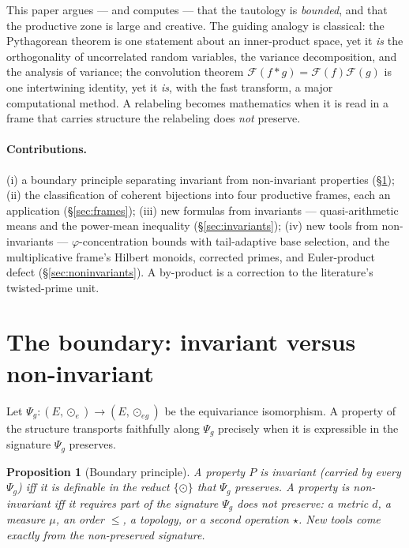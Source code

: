 \documentclass[11pt,a4paper]{article}
\theoremstyle{plain}
\newtheorem{proposition}[theorem]{Proposition}
\theoremstyle{definition}
\theoremstyle{remark}
\begin{document}
This paper argues --- and computes --- that the tautology is \emph{bounded}, and
that the productive zone is large and creative. The guiding analogy is classical:
the Pythagorean theorem is one statement about an inner-product space, yet it
\emph{is} the orthogonality of uncorrelated random variables, the variance
decomposition, and the analysis of variance; the convolution theorem
$\mathcal F(f*g)=\mathcal F(f)\mathcal F(g)$ is one intertwining identity, yet it
\emph{is}, with the fast transform, a major computational method. A relabeling
becomes mathematics when it is read in a frame that carries structure the
relabeling does \emph{not} preserve.

\paragraph{Contributions.} (i) a boundary principle separating invariant from
non-invariant properties (\S\ref{sec:boundary}); (ii) the classification of
coherent bijections into four productive frames, each an application
(\S\ref{sec:frames}); (iii) new formulas from invariants --- quasi-arithmetic
means and the power-mean inequality (\S\ref{sec:invariants}); (iv) new tools from
non-invariants --- $\varphi$-concentration bounds with tail-adaptive base
selection, and the multiplicative frame's Hilbert monoids, corrected primes, and
Euler-product defect (\S\ref{sec:noninvariants}). A by-product is a correction to
the literature's twisted-prime unit.

\section{The boundary: invariant versus non-invariant}
\label{sec:boundary}

Let $\Psi_g:(E,\odot_e)\to(E,\odot_{eg})$ be the equivariance isomorphism. A
property of the structure transports faithfully along $\Psi_g$ precisely when it
is expressible in the signature $\Psi_g$ preserves.

\begin{proposition}[Boundary principle]\label{prop:boundary}
A property $P$ is \emph{invariant} (carried by every $\Psi_g$) iff it is
definable in the reduct $\{\odot\}$ that $\Psi_g$ preserves. A property is
\emph{non-invariant} iff it requires part of the signature $\Psi_g$ does not
preserve: a metric $d$, a measure $\mu$, an order $\le$, a topology, or a second
operation $\star$. New tools come exactly from the non-preserved signature.
\end{proposition}
\end{document}
